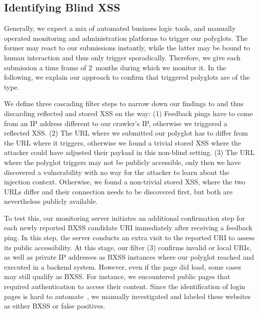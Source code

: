 \subsection{Identifying Blind XSS}\label{sec:bxss-filter}

\noindent
Generally, we expect a mix of automated business logic tools, and manually operated monitoring and administration platforms to trigger our polyglots.
The former may react to our submissions instantly, while the latter may be bound to human interaction and thus only trigger sporadically.
Therefore, we give each submission a time frame of \num{2}~months during which we monitor it.
In the following, we explain our approach to confirm that triggered polyglots are of the \blindxss{} type.

We define three cascading filter steps to narrow down our findings to \blindxss{} and thus discarding reflected and stored XSS on the way:
(1) Feedback pings have to come from an IP address different to our crawler's IP, otherwise we triggered a reflected XSS\@.
(2) The URL where we submitted our polyglot has to differ from the URL where it triggers, otherwise we found a trivial stored XSS where the attacker could have adjusted their payload in this non-blind setting.
(3) The URL where the polyglot triggers may not be publicly accessible, only then we have discovered a \blindxss{} vulnerability with no way for the attacker to learn about the injection context.
Otherwise, we found a non-trivial stored XSS, where the two URLs differ and their connection needs to be discovered first, but both are nevertheless publicly available.

To test this, our monitoring server initiates an additional confirmation step for each newly reported BXSS candidate URI immediately after receiving a feedback ping.
In this step, the server conducts an extra visit to the reported URI to assess its public accessibility.
At this stage, our filter (3) confirms invalid or local URIs, as well as private IP addresses as BXSS instances where our polyglot reached and executed in a backend system.
However, even if the page did load, some cases may still qualify as BXSS\@.
For instance, we encountered public pages that required authentication to access their content.
Since the identification of login pages is hard to automate~\cite{jonkerShepherdGenericApproach2020, drakonakis2020cookie}, we manually investigated and labeled these websites as either BXSS or false positives.


